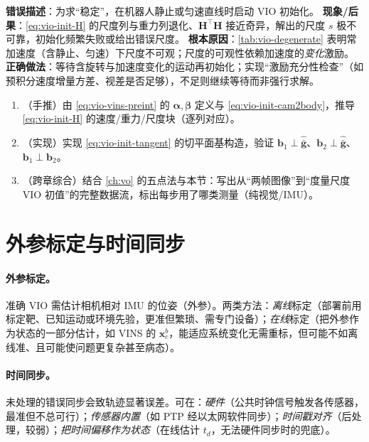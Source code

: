 \begin{pitfall}
\textbf{错误描述}：为求“稳定”，在机器人静止或匀速直线时启动 VIO 初始化。
\textbf{现象/后果}：\cref{eq:vio-init-H} 的尺度列与重力列退化、$\mathbf{H}^\top\mathbf{H}$ 接近奇异，解出的尺度 $s$ 极不可靠，初始化频繁失败或给出错误尺度。
\textbf{根本原因}：\cref{tab:vio-degenerate} 表明常加速度（含静止、匀速）下尺度不可观；尺度的可观性依赖加速度的\emph{变化}激励。
\textbf{正确做法}：等待含旋转与加速度变化的运动再初始化；实现“激励充分性检查”（如预积分速度增量方差、视差是否足够），不足则继续等待而非强行求解。
\end{pitfall}

\begin{practice}
\begin{enumerate}
  \item （手推）由 \cref{eq:vio-vins-preint} 的 $\boldsymbol{\alpha},\boldsymbol{\beta}$ 定义与 \cref{eq:vio-init-cam2body}，推导 \cref{eq:vio-init-H} 的速度/重力/尺度块（逐列对应）。
  \item （实现）实现 \cref{eq:vio-init-tangent} 的切平面基构造，验证 $\mathbf{b}_1\perp\hat{\bar{\mathbf{g}}}$、$\mathbf{b}_2\perp\hat{\bar{\mathbf{g}}}$、$\mathbf{b}_1\perp\mathbf{b}_2$。
  \item （跨章综合）结合 \cref{ch:vo} 的五点法与本节：写出从“两帧图像”到“度量尺度 VIO 初值”的完整数据流，标出每步用了哪类测量（纯视觉/IMU）。
\end{enumerate}
\end{practice}

\section{外参标定与时间同步}
\label{sec:vio-calib}

\paragraph{外参标定。}
准确 VIO 需估计相机相对 IMU 的位姿（外参）\cite{carlone2026handbook}。两类方法：\emph{离线}标定（部署前用标定靶、已知运动或环境先验，更准但繁琐、需专门设备）；\emph{在线}标定（把外参作为状态的一部分估计，如 VINS 的 $\mathbf{x}^b_c$，能适应系统变化无需重标，但可能不如离线准、且可能使问题更复杂甚至病态）。

\paragraph{时间同步。}
未处理的错误同步会致轨迹显著误差。可在：\emph{硬件}（公共时钟信号触发各传感器，最准但不总可行）；\emph{传感器内置}（如 PTP 经以太网软件同步）；\emph{时间戳对齐}（后处理，较弱）；\emph{把时间偏移作为状态}（在线估计 $t_d$，无法硬件同步时的兜底）\cite{carlone2026handbook}。

